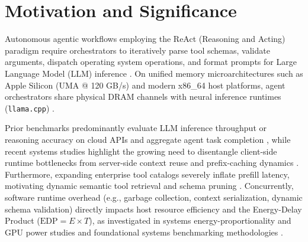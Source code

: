 \documentclass[11pt,a4paper]{article}
\begin{document}
\section{Motivation and Significance}
\label{sec:motivation}
Autonomous agentic workflows employing the ReAct (Reasoning and Acting) paradigm \cite{yao2023react} require orchestrators to iteratively parse tool schemas, validate arguments, dispatch operating system operations, and format prompts for Large Language Model (LLM) inference \cite{yao2023react, kwon2023vllm}. On unified memory microarchitectures such as Apple Silicon (UMA @ 120 GB/s) and modern x86\_64 host platforms, agent orchestrators share physical DRAM channels with neural inference runtimes (\texttt{llama.cpp}) \cite{williams2009roofline, maricq2018taming}. 

Prior benchmarks predominantly evaluate LLM inference throughput or reasoning accuracy on cloud APIs and aggregate agent task completion \cite{reddi2020mlperf, yao2023react, zheng2023judging}, while recent systems studies highlight the growing need to disentangle client-side runtime bottlenecks from server-side context reuse and prefix-caching dynamics \cite{kwon2023vllm}. Furthermore, expanding enterprise tool catalogs severely inflate prefill latency, motivating dynamic semantic tool retrieval and schema pruning \cite{kwon2023vllm}. Concurrently, software runtime overhead (e.g., garbage collection, context serialization, dynamic schema validation) directly impacts host resource efficiency and the Energy-Delay Product ($\text{EDP} = E \times T$), as investigated in systems energy-proportionality and GPU power studies \cite{barroso2007case, you2023zeus} and foundational systems benchmarking methodologies \cite{kalibera2013rigorous, hoefler2015scientific, maricq2018taming, kuensch1989jackknife}. 
\end{document}
